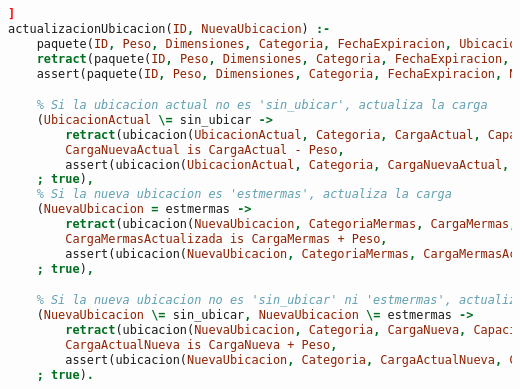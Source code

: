 \documentclass[12pt]{article}
\begin{document}
\begin{lstlisting}[language=Prolog, caption={Actualizar ubicación de un paquete}, label={lst:actualizacionUbicacion}]]
actualizacionUbicacion(ID, NuevaUbicacion) :-
    paquete(ID, Peso, Dimensiones, Categoria, FechaExpiracion, UbicacionActual),
    retract(paquete(ID, Peso, Dimensiones, Categoria, FechaExpiracion, UbicacionActual)),
    assert(paquete(ID, Peso, Dimensiones, Categoria, FechaExpiracion, NuevaUbicacion)),

    % Si la ubicacion actual no es 'sin_ubicar', actualiza la carga
    (UbicacionActual \= sin_ubicar ->
        retract(ubicacion(UbicacionActual, Categoria, CargaActual, CapacidadPesoActual, CapacidadVolumenActual, CategoriaPesoActual)),
        CargaNuevaActual is CargaActual - Peso,
        assert(ubicacion(UbicacionActual, Categoria, CargaNuevaActual, CapacidadPesoActual, CapacidadVolumenActual, CategoriaPesoActual))
    ; true),
    % Si la nueva ubicacion es 'estmermas', actualiza la carga
    (NuevaUbicacion = estmermas ->
        retract(ubicacion(NuevaUbicacion, CategoriaMermas, CargaMermas, CapacidadPesoMermas, CapacidadVolumenMermas, CategoriaPesoMermas)),
        CargaMermasActualizada is CargaMermas + Peso,
        assert(ubicacion(NuevaUbicacion, CategoriaMermas, CargaMermasActualizada, CapacidadPesoMermas, CapacidadVolumenMermas, CategoriaPesoMermas))
    ; true),

    % Si la nueva ubicacion no es 'sin_ubicar' ni 'estmermas', actualiza la carga
    (NuevaUbicacion \= sin_ubicar, NuevaUbicacion \= estmermas ->
        retract(ubicacion(NuevaUbicacion, Categoria, CargaNueva, CapacidadPesoNueva, CapacidadVolumenNueva, CategoriaPesoEstante)),
        CargaActualNueva is CargaNueva + Peso,
        assert(ubicacion(NuevaUbicacion, Categoria, CargaActualNueva, CapacidadPesoNueva, CapacidadVolumenNueva, CategoriaPesoEstante))
    ; true).

\end{lstlisting}
\end{document}

